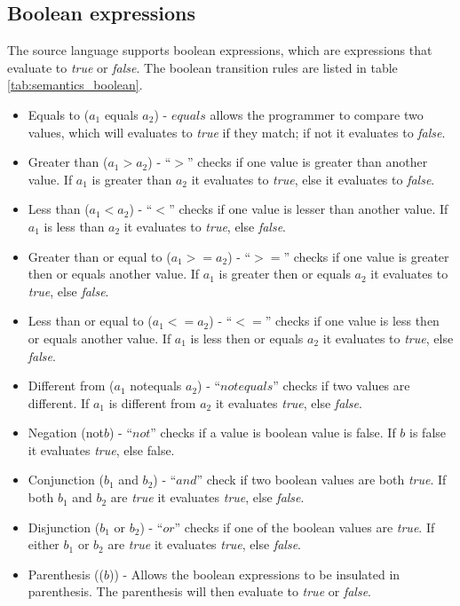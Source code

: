 \subsection{Boolean expressions}
The source language supports boolean expressions, which are expressions that evaluate to \textit{true} or \textit{false}. The boolean transition rules are listed in table \ref{tab:semantics_boolean}.
\begin{itemize}
	\item Equals to ($a_1$ equals $a_2$) - $equals$ allows the programmer to compare two values, which will evaluates to \textit{true} if they match; if not it evaluates to \textit{false}.
	\item Greater than ($a_1 > a_2$) - ``$>$'' checks if one value is greater than another value. If $a_1$ is greater than $a_2$ it evaluates to \textit{true}, else it evaluates to \textit{false}.
	\item Less than ($a_1 < a_2$) - ``$<$'' checks if one value is lesser than another value. If $a_1$ is less than $a_2$ it evaluates to \textit{true}, else \textit{false}.
	\item Greater than or equal to ($a_1 >= a_2$) - ``$>=$'' checks if one value is greater then or equals another value. If $a_1$ is greater then or equals $a_2$ it evaluates to \textit{true}, else \textit{false}.
	\item Less than or equal to ($a_1 <= a_2$) - ``$<=$'' checks if one value is less then or equals another value. If $a_1$ is less then or equals $a_2$ it evaluates to \textit{true}, else \textit{false}.
	\item Different from ($a_1$ notequals $a_2$) - ``$notequals$'' checks if two values are different. If $a_1$ is different from $a_2$ it evaluates \textit{true}, else \textit{false}. 
	\item Negation (not$b$) - ``$not$'' checks if a value is boolean value is false. If $b$ is false it evaluates \textit{true}, else false.
	\item Conjunction ($b_1$ and $b_2$) - ``$and$'' check if two boolean values are both \textit{true}. If both $b_1$ and $b_2$ are \textit{true} it evaluates \textit{true}, else \textit{false}. 
	\item Disjunction ($b_1$ or $b_2$) - ``$or$'' checks if one of the boolean values are \textit{true}. If either $b_1$ or $b_2$ are \textit{true} it evaluates \textit{true}, else \textit{false}.
	\item Parenthesis (($b$)) - Allows the boolean expressions to be insulated in parenthesis. The parenthesis will then evaluate to \textit{true} or \textit{false}.
\end{itemize}
